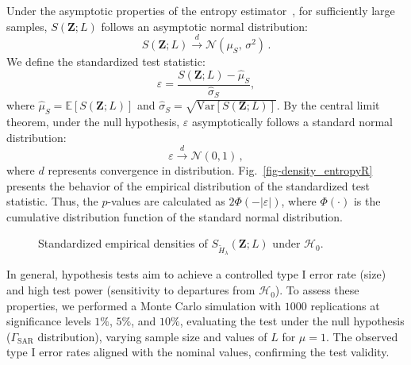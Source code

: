 \documentclass[
  journal,
]{IEEEtran}%
\begin{document}
Under the asymptotic properties of the entropy
estimator~, for sufficiently
large samples, \(S(\bm{Z}; L)\) follows an asymptotic normal
distribution: \begin{equation*}
S(\bm{Z}; L) \overset{d}{\longrightarrow} \mathcal{N}(\mu_S,\,\sigma^{2})\,.
\end{equation*} We define the standardized test statistic:
\begin{equation*}
\varepsilon = \frac{S(\bm{Z}; L) - \hat{\mu}_S}{\hat{\sigma}_S},
\end{equation*} where \(\hat{\mu}_S = \mathbb{E}[S(\bm{Z}; L)]\) and
\(\hat{\sigma}_S = \sqrt{\text{Var}[S(\bm{Z}; L)]}\). By the central
limit theorem, under the null hypothesis, \(\varepsilon\) asymptotically
follows a standard normal distribution: \begin{equation*}
\varepsilon \overset{d}{\longrightarrow} \mathcal{N}(0,1)\,,
\end{equation*} where \(d\) represents convergence in distribution.
Fig.~\ref{fig-density_entropyR} presents the behavior of the empirical
distribution of the standardized test statistic. Thus, the \(p\)-values
are calculated as \(2\Phi(-|\varepsilon|)\), where \(\Phi(\cdot)\) is
the cumulative distribution function of the standard normal
distribution.

\begin{figure}[hbt]


\caption{\label{fig-density_entropyR_standardized0}Standardized
empirical densities of \(S_{\widetilde{H}_{\lambda}}(\bm{Z}; L)\) under
\(\mathcal{H}_0\).}

\end{figure}%

In general, hypothesis tests aim to achieve a controlled type I error
rate (size) and high test power (sensitivity to departures from
\(\mathcal{H}_0\)). To assess these properties, we performed a Monte
Carlo simulation with \(1000\) replications at significance levels
\(1\%\), \(5\%\), and \(10\%\), evaluating the test under the null
hypothesis (\(\Gamma_{\text{SAR}}\) distribution), varying sample size
and values of \(L\) for \(\mu=1\). The observed type I error rates
aligned with the nominal values, confirming the test validity.
\end{document}
